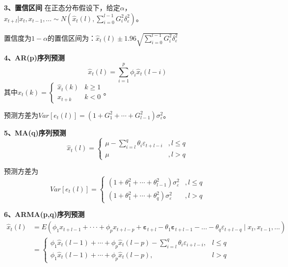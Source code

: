 \documentclass[12pt, a4paper, oneside]{ctexbook}
\begin{document}
\textbf{3、置信区间}
在正态分布假设下，给定$\alpha$，$x_{t+l}|x_t,x_{t-1},... \sim
    N(\hat{x}_t(l),\sum_{i=0}^{l-1} G_{i}^{2}\delta_{\varepsilon}^2)$。

置信度为$1-\alpha$的置信区间为：$\hat{x}_t(l)\pm 1.96\sqrt{\sum_{i=0}^{l-1} G_{i}^{2}\delta_{\varepsilon}^2}$

\textbf{4、AR(p)序列预测}
\begin{equation}
    \hat{x}_t(l) = \sum_{i=1}^{p} \phi_i \hat{x}_t(l-i)
\end{equation}
其中$\hat{x}_t(k) = \begin{cases}
        \hat{x}_t(k) & k \geq 1 \\
        x_{t+k}      & k < 0
    \end{cases}$。

预测方差为$Var[e_t(l)]=(1+G_1^2+\cdots+G_{l-1}^2)\sigma_\varepsilon^2$。

\textbf{5、MA(q)序列预测}
\begin{equation}
    \hat{x}_t\left(l\right)=
    \begin{cases}
        \mu-\sum\limits_{i=l}^q\theta_i\varepsilon_{t+l-i} & ,l\leq q \\
        \mu                                                & ,l>q
    \end{cases}
\end{equation}

预测方差为
\begin{equation}
    Var[e_t(l)]=
    \begin{cases}
        (1+\theta_1^2+\cdots+\theta_{l-1}^2)\sigma_\varepsilon^2 & ,l\leq q \\
        (1+\theta_1^2+\cdots+\theta_q^2)\sigma_\varepsilon^2     & ,l>q
    \end{cases}
\end{equation}

\textbf{6、ARMA(p,q)序列预测}
\begin{equation}
    \begin{aligned}
        \hat{x}_{t}(l) & =E(\phi_1x_{t+l-1}+\cdotp\cdotp\cdotp+\phi_px_{t+l-p}+\boldsymbol{\varepsilon}_{t+l}
        -\theta_1\boldsymbol{\varepsilon}_{t+l-1}-...-\theta_q\varepsilon_{t+l-q}\mid x_t,x_{t-1},...)        \\
                       & =
        \begin{cases}
            \phi_1\hat{x}_t(l-1)+\cdots+\phi_p\hat{x}_t(l-p)-\sum_{i=l}^q\theta_i\varepsilon_{i+l-i}, & l\leqslant q \\
            \phi_1\hat{x}_t(l-1)+\cdots+\phi_p\hat{x}_t(l-p) ,                                        & l>q
        \end{cases}
    \end{aligned}
\end{equation}
\end{document}
